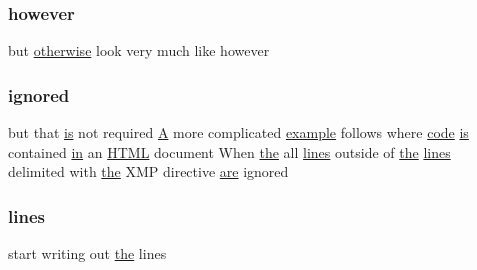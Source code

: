 \subsubsection{\texorpdfstring{however}{however}}
{\footnotesize\ttfamily but \hyperlink{exit_87_8txt_add9358f1f2e831e2906102c98d66905f}{otherwise} look very much like however}

\mbox{\label{ufpp__overview_81_8txt_a41b072d4e414a3fa706019354766d5a8}} 
\subsubsection{\texorpdfstring{ignored}{ignored}}
{\footnotesize\ttfamily but that \hyperlink{intro__blas1_83_8txt_a42a91df93f840595de3019ceb5d1df23}{is} not required \hyperlink{ufpp__overview_81_8txt_a8341271e5f4e3003f6eb1c9547fc9d1a}{A} more complicated \hyperlink{option__stopwatch_83_8txt_a234fb06c9989676e2603991316e7ddc3}{example} follows where \hyperlink{ufpp__overview_81_8txt_a74a0615f2d9c4a398d9126096f8092f8}{code} \hyperlink{intro__blas1_83_8txt_a42a91df93f840595de3019ceb5d1df23}{is} contained \hyperlink{M__journal_83_8txt_afce72651d1eed785a2132bee863b2f38}{in} an \hyperlink{notes_8txt_a5589c3717ecf4ab40eee95e236b19dad}{H\+T\+ML} document When \hyperlink{M__stopwatch_83_8txt_a0f266597de2e57eb3aa964927bb30e14}{the} all \hyperlink{ufpp__overview_81_8txt_a38547e77f801e6266edc9bcd56b63a00}{lines} outside of \hyperlink{M__stopwatch_83_8txt_a0f266597de2e57eb3aa964927bb30e14}{the} \hyperlink{ufpp__overview_81_8txt_a38547e77f801e6266edc9bcd56b63a00}{lines} delimited with \hyperlink{M__stopwatch_83_8txt_a0f266597de2e57eb3aa964927bb30e14}{the} X\+MP directive \hyperlink{M__stopwatch_83_8txt_a5040be02b832eba08820289c8a1f81c4}{are} ignored}

\mbox{\label{ufpp__overview_81_8txt_a38547e77f801e6266edc9bcd56b63a00}} 
\subsubsection{\texorpdfstring{lines}{lines}}
{\footnotesize\ttfamily start writing out \hyperlink{M__stopwatch_83_8txt_a0f266597de2e57eb3aa964927bb30e14}{the} lines}

